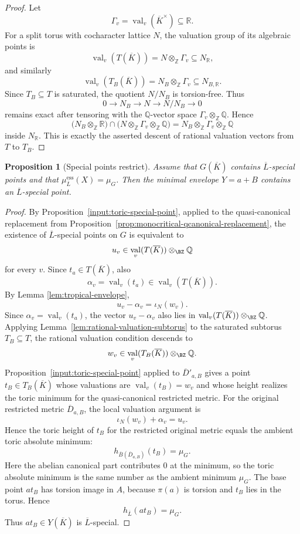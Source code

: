\documentclass[10pt,a4paper]{amsart}
\theoremstyle{plain}
\newtheorem{proposition}[theorem]{Proposition}
\DeclareMathOperator{\val}{val}
\newcommand{\BQ}{{\mathbb {Q}}} \newcommand{\BR}{{\mathbb {R}}}
\theoremstyle{plain}
\numberwithin{equation}{section}
\providecommand{\bD}{\overline{D}}
\providecommand{\bL}{\overline{L}}
\providecommand{\muess}{\mu^{\mathrm{ess}}}
\begin{document}
\begin{proof}
	Let
	\[
	\Gamma_v=\val_v(\overline K^{\times})\subseteq\mathbb R .
	\]
	For a split torus with cocharacter lattice \(N\), the valuation group of its
	algebraic points is
	\[
	\val_v(T(\overline K))=N\otimes_{\mathbb Z}\Gamma_v
	\subseteq N_{\mathbb R},
	\]
	and similarly
	\[
	\val_v(T_B(\overline K))=N_B\otimes_{\mathbb Z}\Gamma_v
	\subseteq N_{B,\mathbb R}.
	\]
	Since \(T_B\subseteq T\) is saturated, the quotient \(N/N_B\) is torsion-free.
	Thus
	\[
	0\longrightarrow N_B\longrightarrow N\longrightarrow N/N_B\longrightarrow0
	\]
	remains exact after tensoring with the \(\mathbb Q\)-vector space
	\(\Gamma_v\otimes_{\mathbb Z}\mathbb Q\).  Hence
	\[
	\bigl(N_B\otimes_{\mathbb Z}\mathbb R\bigr)\cap
	\bigl(N\otimes_{\mathbb Z}\Gamma_v\otimes_{\mathbb Z}\mathbb Q\bigr)
	=
	N_B\otimes_{\mathbb Z}\Gamma_v\otimes_{\mathbb Z}\mathbb Q
	\]
	inside \(N_{\mathbb R}\).  This is exactly the asserted descent of rational
	valuation vectors from \(T\) to \(T_B\).
\end{proof}

\begin{proposition}[Special points restrict]\label{prop:special-restrict}
	Assume that \(G(\overline{K})\) contains \(\bL\)-special points and that
	\(\muess_{\bL}(X)=\mu_G\).  Then the minimal envelope \(Y=a+B\) contains an
	\(\bL\)-special point.
\end{proposition}

\begin{proof}
	By Proposition~\ref{input:toric-special-point}, applied to the quasi-canonical
	replacement from Proposition~\ref{prop:monocritical-qcanonical-replacement},
	the existence of \(\bL\)-special points on \(G\) is equivalent to
	\[
	u_v\in \val_v(T(\overline{K}))\otimes_{\BZ}\BQ
	\]
	for every \(v\).  Since \(t_a\in T(\overline{K})\), also
	\[
	\alpha_v=\val_v(t_a)\in \val_v(T(\overline{K})).
	\]
	By Lemma \ref{lem:tropical-envelope},
	\[
	u_v-\alpha_v=\iota_N(w_v).
	\]
	Since \(\alpha_v=\val_v(t_a)\), the vector \(u_v-\alpha_v\) also lies in
	\(\val_v(T(\overline K))\otimes_{\BZ}\BQ\).  Applying
	Lemma~\ref{lem:rational-valuation-subtorus} to the saturated subtorus
	\(T_B\subseteq T\), the rational valuation condition descends to
	\[
	w_v\in \val_v(T_B(\overline{K}))\otimes_{\BZ}\BQ.
	\]
	Proposition~\ref{input:toric-special-point} applied to
	\(\bD'_{a,B}\) gives a point \(t_B\in T_B(\overline{K})\) whose valuations are
	\(\val_v(t_B)=w_v\) and whose height realizes the toric minimum for the
	quasi-canonical restricted metric.  For the original restricted metric
	\(\bD_{a,B}\), the local valuation argument is
	\[
	\iota_N(w_v)+\alpha_v=u_v.
	\]
	Hence the toric height of \(t_B\) for the restricted original metric equals
	the ambient toric absolute minimum:
	\[
	h_{\overline B(\bD_{a,B})}(t_B)=\mu_G.
	\]
	Here the abelian canonical part contributes \(0\) at the minimum, so the toric
	absolute minimum is the same number as the ambient minimum \(\mu_G\).
	The base point \(a t_B\) has torsion image in \(A\), because \(\pi(a)\) is
	torsion and \(t_B\) lies in the torus.  Hence
	\[
	h_{\bL}(a t_B)=\mu_G.
	\]
	Thus \(a t_B\in Y(\overline{K})\) is \(\bL\)-special.
\end{proof}
\end{document}
